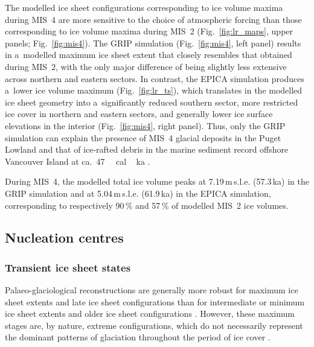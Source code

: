 \documentclass[tc, manuscript]{copernicus}
\begin{document}
      The modelled ice sheet configurations corresponding to ice volume
      maxima during MIS~4 are more sensitive to the choice of atmospheric
      forcing than those corresponding to ice volume maxima during MIS~2
      (Fig.~\ref{fig:lr_maps}, upper panels; Fig.~\ref{fig:mis4}). The GRIP
      simulation (Fig.~\ref{fig:mis4}, left panel) results in a~modelled
      maximum ice sheet extent that closely resembles that obtained during
      MIS~2, with the only major difference of being slightly less extensive
      across northern and eastern sectors. In contrast, the EPICA simulation
      produces a~lower ice volume maximum (Fig.~\ref{fig:lr_ts}), which
      translates in the modelled ice sheet geometry into a~significantly
      reduced southern sector, more restricted ice cover in northern and
      eastern sectors, and generally lower ice surface elevations in the
      interior (Fig.~\ref{fig:mis4}, right panel). Thus, only the GRIP
      simulation can explain the presence of MIS~4 glacial deposits in the
      Puget Lowland \citep{Troost.2014} and that of ice-rafted debris in the
      marine sediment record offshore Vancouver Island at
      ca.~47\,\unit{\,cal\,ka} \citep{Cosma.etal.2008}.

      During MIS~4, the modelled total ice volume peaks at
      7.19\,\unit{m}\,s.l.e. (57.3\,\unit{ka}) in the GRIP simulation and at
      5.04\,\unit{m}\,s.l.e. (61.9\,\unit{ka}) in the EPICA simulation,
      corresponding to respectively 90\,\% and 57\,\% of modelled MIS~2 ice
      volumes.

\subsection{Nucleation centres}

\subsubsection{Transient ice sheet states}

      Palaeo-glaciological reconstructions are generally more robust for
      maximum ice sheet extents and late ice sheet configurations than for
      intermediate or minimum ice sheet extents and older ice sheet
      configurations \citep{Kleman.etal.2010}. However, these maximum stages
      are, by nature, extreme configurations, which do not necessarily
      represent the dominant patterns of glaciation throughout the period of
      ice cover \citep{Porter.1989, Kleman.Stroeven.1997, Kleman.etal.2008,
      Kleman.etal.2010}.
\end{document}
